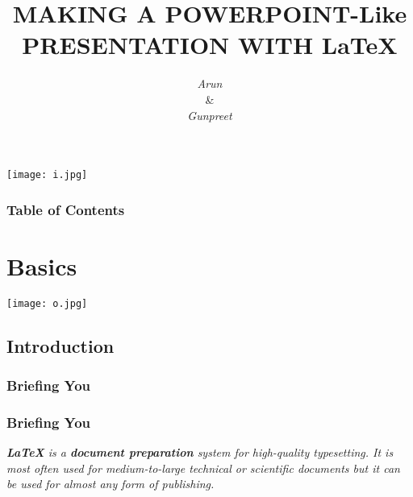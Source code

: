 \documentclass{beamer}
\begin{document}


\title{MAKING A POWERPOINT-Like PRESENTATION WITH \LaTeX}
\author{{\color{red}\large{\textit{Arun}}}  \\ \color{brown}\& \\  {\color{violet}\large{\textit{Gunpreet}}}}
                {\texttt{[image: i.jpg]}}

        \begin{frame}
        \transblindshorizontal
            \titlepage
        \end{frame}

        
        \begin{frame}[shrink]
        \frametitle{Table of Contents}
        \transblindsvertical
                \tableofcontents{}
        \end{frame}

        
        \section{Basics}
                {\texttt{[image: o.jpg]}}

            \subsection{Introduction}

            \subsubsection{Briefing You}
            \begin{frame}
            \frametitle{Briefing You}
            \transboxin

                \textsl{\textbf{\LaTeX} is a \textbf{document preparation} system for high-quality typesetting. It is most often used for medium-to-large technical or scientific documents but it can be used for almost any form of publishing.}
            \end{frame}
            
\end{document}
